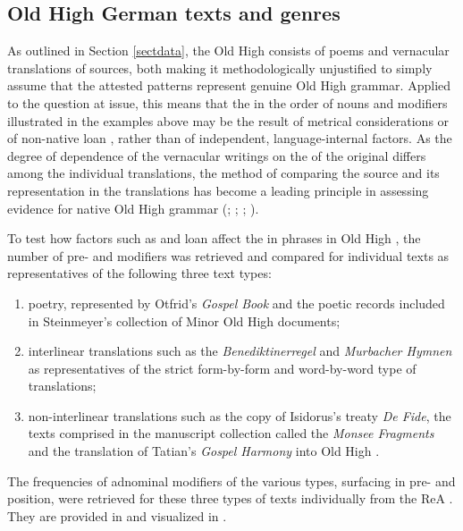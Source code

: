 \documentclass[output=paper,colorlinks,citecolor=brown,draft]{langscibook}
\begin{document}
\subsection{Old High German texts and genres}\label{ssectOHGtextgenres}
As outlined in Section \ref{sectdata}, the Old High   consists of poems and vernacular translations of  sources, both making it methodologically unjustified to simply assume that the attested  patterns represent genuine Old High  grammar. Applied to the question at issue, this means that the  in the order of nouns and modifiers illustrated in the examples above may be the result of metrical considerations or of non-native loan , rather than of independent, language-internal factors. As the degree of dependence of the vernacular writings on the  of the  original differs among the individual translations, the method of comparing the source  and its representation in the translations has become a leading principle in assessing evidence for native Old High  grammar (\cite{DittmerDittmer98}; \cite{Donhauser98}; \cite{Fleischer06}; \cite{Fleischeretal08}). 
	
 To test how factors such as  and loan  affect the  in  phrases in Old High , the number of pre- and  modifiers was retrieved and compared for individual texts as representatives of the following three text types:

 \begin{enumerate}[label=(\roman*)]
     \item poetry, represented by Otfrid’s \textit{Gospel Book} and the poetic records included in Steinmeyer’s \citeyearpar{vonSteinmeyer16} collection of Minor Old High  documents;
     \item interlinear translations such as the \textit{Benediktinerregel} and \textit{Murbacher Hymnen} as representatives of the strict form-by-form and word-by-word type of translations;
     \item non-interlinear translations such as the copy of Isidorus’s treaty \textit{De Fide}, the texts comprised in the manuscript collection called the \textit{Monsee Fragments} and the translation of Tatian’s \textit{Gospel Harmony} into Old High .
 \end{enumerate}

The frequencies of adnominal modifiers of the various types, surfacing in pre- and  position, were retrieved for these three types of texts individually from the ReA . They are provided in  and visualized in .
\end{document}
